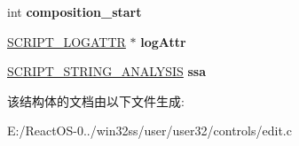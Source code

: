 \begin{DoxyCompactItemize}
int {\bfseries composition\+\_\+start}
\item 
\mbox{\label{struct_e_d_i_t_s_t_a_t_e_aada7e0668f88de89d51fa03f482aa66d}} 
\hyperlink{structtag___s_c_r_i_p_t___l_o_g_a_t_t_r}{S\+C\+R\+I\+P\+T\+\_\+\+L\+O\+G\+A\+T\+TR} $\ast$ {\bfseries log\+Attr}
\item 
\mbox{\label{struct_e_d_i_t_s_t_a_t_e_ad194896c7778976512fc05de0b5081f2}} 
\hyperlink{interfacevoid}{S\+C\+R\+I\+P\+T\+\_\+\+S\+T\+R\+I\+N\+G\+\_\+\+A\+N\+A\+L\+Y\+S\+IS} {\bfseries ssa}
\end{DoxyCompactItemize}


该结构体的文档由以下文件生成\+:\begin{DoxyCompactItemize}
\item 
E\+:/\+React\+O\+S-\/0../win32ss/user/user32/controls/edit.\+c\end{DoxyCompactItemize}

